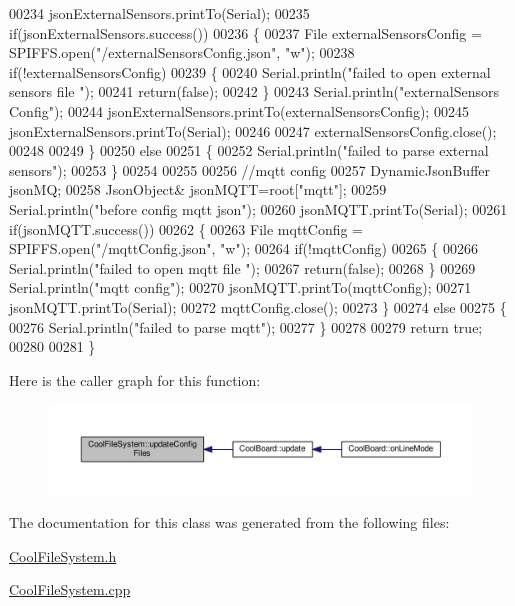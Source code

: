 \begin{DoxyCode}
00234     jsonExternalSensors.printTo(Serial);
00235     \textcolor{keywordflow}{if}(jsonExternalSensors.success())
00236     \{
00237         File externalSensorsConfig = SPIFFS.open(\textcolor{stringliteral}{"/externalSensorsConfig.json"}, \textcolor{stringliteral}{"w"});   
00238         \textcolor{keywordflow}{if}(!externalSensorsConfig)
00239         \{
00240             Serial.println(\textcolor{stringliteral}{"failed to open external sensors file "});
00241             \textcolor{keywordflow}{return}(\textcolor{keyword}{false});
00242         \}
00243         Serial.println(\textcolor{stringliteral}{"externalSensors Config"});
00244         jsonExternalSensors.printTo(externalSensorsConfig);
00245         jsonExternalSensors.printTo(Serial);
00246     
00247         externalSensorsConfig.close();
00248 
00249     \}
00250     \textcolor{keywordflow}{else}
00251     \{
00252         Serial.println(\textcolor{stringliteral}{"failed to parse external sensors"}); 
00253     \}
00254 
00255     
00256     \textcolor{comment}{//mqtt config}
00257     DynamicJsonBuffer jsonMQ;
00258         JsonObject& jsonMQTT=root[\textcolor{stringliteral}{"mqtt"}];
00259     Serial.println(\textcolor{stringliteral}{"before config mqtt json"});
00260     jsonMQTT.printTo(Serial);
00261     \textcolor{keywordflow}{if}(jsonMQTT.success())
00262     \{
00263         File mqttConfig = SPIFFS.open(\textcolor{stringliteral}{"/mqttConfig.json"}, \textcolor{stringliteral}{"w"}); 
00264         \textcolor{keywordflow}{if}(!mqttConfig)
00265         \{
00266             Serial.println(\textcolor{stringliteral}{"failed to open mqtt file "});        
00267             \textcolor{keywordflow}{return}(\textcolor{keyword}{false});
00268         \}
00269         Serial.println(\textcolor{stringliteral}{"mqtt config"});
00270         jsonMQTT.printTo(mqttConfig);
00271         jsonMQTT.printTo(Serial);
00272         mqttConfig.close();
00273     \}
00274     \textcolor{keywordflow}{else}
00275     \{
00276         Serial.println(\textcolor{stringliteral}{"failed to parse mqtt"}); 
00277     \}   
00278         
00279     \textcolor{keywordflow}{return} \textcolor{keyword}{true};
00280 
00281 \}   
\end{DoxyCode}
Here is the caller graph for this function\+:
\nopagebreak
\begin{figure}[H]
\begin{center}
\leavevmode
\includegraphics[width=350pt]{class_cool_file_system_a32dad79ae80182a83e2e8f52286b7c7b_icgraph}
\end{center}
\end{figure}


The documentation for this class was generated from the following files\+:\begin{DoxyCompactItemize}
\item 
\hyperlink{_cool_file_system_8h}{Cool\+File\+System.\+h}\item 
\hyperlink{_cool_file_system_8cpp}{Cool\+File\+System.\+cpp}\end{DoxyCompactItemize}
